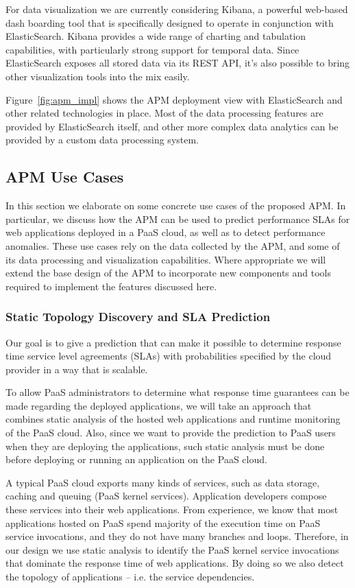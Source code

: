 For data visualization we are currently considering Kibana, a powerful web-based dash boarding tool 
that is specifically designed to operate in conjunction with ElasticSearch. Kibana provides a wide
range of charting and tabulation capabilities, with particularly strong support for temporal data.  Since
ElasticSearch exposes all stored data via its REST API, it's also possible to bring other visualization
tools into the mix easily.

Figure~\ref{fig:apm_impl} shows the APM deployment view with ElasticSearch and other related technologies
in place. Most of the data processing features are provided by ElasticSearch itself, and other more complex
data analytics can be provided by a custom data processing system. 

\subsection{APM Use Cases}
In this section we elaborate on some concrete use cases of the proposed APM. In particular, we discuss how
the APM can be used to predict performance SLAs for web applications deployed in a PaaS cloud, as well
as to detect performance anomalies. These use cases rely on the data collected by the APM, and some
of its data processing and visualization capabilities. Where appropriate we will extend the base design
of the APM to incorporate new components and tools required to implement the features discussed here.

\subsubsection{Static Topology Discovery and SLA Prediction}
Our goal is to give a prediction that can make it possible to determine response time service level agreements (SLAs)
with probabilities specified by the cloud provider in a way that is scalable.

To allow PaaS administrators to determine what response time guarantees can be made
regarding the deployed applications,
we will take an approach that combines static analysis of the hosted web applications and runtime monitoring of the PaaS cloud. 
Also, since we want to provide the prediction to PaaS users when they are deploying the applications,
such static analysis must be done before deploying or running an application on the PaaS cloud. 

A typical PaaS cloud exports many kinds of services, such as data storage, caching and queuing (PaaS kernel
services). Application developers
compose these services into their web applications. 
From experience, we know that most applications hosted on PaaS spend majority of
the execution time on PaaS service invocations, and they do not have many branches and loops. Therefore, in our design we use
static analysis to identify the PaaS kernel service invocations that dominate the response time of web applications.
By doing so we also detect the topology of applications -- i.e. the service dependencies.

